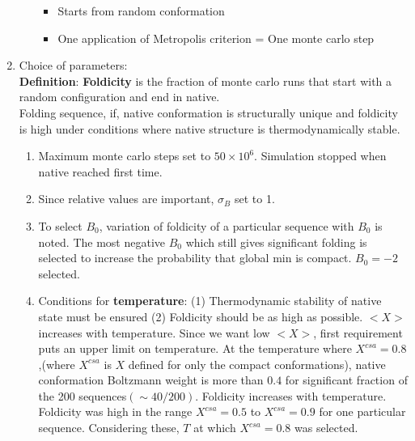 \documentclass[12pt]{article}
\theoremstyle{definition}
\theoremstyle{remark}
\begin{document}
\begin{enumerate}
\begin{itemize}
\begin{itemize}
\item Starts from random conformation
\item One application of Metropolis criterion = One monte carlo step
\end{itemize}
\end{itemize}
\item Choice of parameters:\\ 
\textbf{Definition}: \textbf{Foldicity} is the fraction of monte carlo runs that start with a random configuration and end in native.\\ Folding sequence, if, native conformation is structurally unique and foldicity is high under conditions where native structure is thermodynamically stable.
\begin{enumerate}
\item Maximum monte carlo steps set to $50 \times 10^6$. Simulation stopped when native reached first time.
\item Since relative values are important, $\sigma_B$  set to 1.
\item To select $B_0$, variation of foldicity of a particular sequence with $B_0$ is noted. The most negative $B_0$ which still gives significant folding is selected to increase the probability that global min is compact. $B_0=-2$ selected.
\item Conditions for \textbf{temperature}: (1) Thermodynamic stability of native state must be ensured (2) Foldicity should be as high as possible. $<X>$ increases with temperature. Since we want low $<X>$, first requirement puts an upper limit on temperature. At the temperature where $X^{csa}=0.8$,(where $X^{csa}$ is $X$ defined for only the compact conformations), native conformation Boltzmann weight is more than $0.4$ for significant fraction of the 200 sequences$(\sim 40/200)$. Foldicity increases with temperature. Foldicity was high in the range $X^{csa}=0.5$ to $X^{csa}=0.9$ for one particular sequence. Considering these, $T$ at which $X^{csa}=0.8$ was selected.
\end{enumerate}
\end{enumerate}
\end{document}
